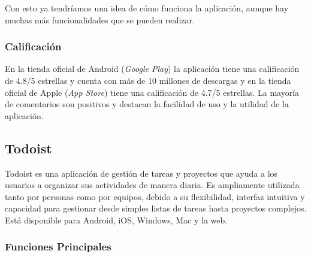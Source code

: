 Con esto ya tendríamos una idea de cómo funciona la aplicación, aunque hay muchas más funcionalidades que se pueden
realizar. 

\subsubsection{Calificación}
\label{subsec:calificacion}
En la tienda oficial de Android (\textit{Google Play}) la aplicación tiene una calificación de 4.8/5 estrellas y cuenta con más de 
10 millones de descargas y en la tienda oficial de Apple (\textit{App Store}) tiene una calificación de 4.7/5 estrellas. La mayoría de comentarios
son positivos y destacan la facilidad de uso y la utilidad de la aplicación.


\subsection{Todoist}
\label{sec:todoist}
Todoist es una aplicación de gestión de tareas y proyectos que ayuda a los usuarios a organizar sus actividades de manera diaria. 
Es ampliamente utilizada tanto por personas como por equipos, debido a su flexibilidad, interfaz intuitiva y capacidad para gestionar
desde simples listas de tareas hasta proyectos complejos. Está disponible para Android, iOS, Windows, Mac y la web.

\subsubsection{Funciones Principales}
\label{subsec:funciones_todoist}

